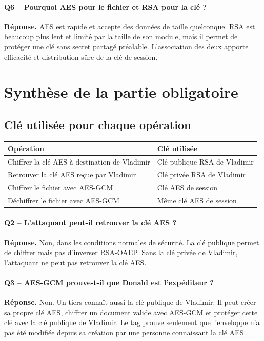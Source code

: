 \documentclass[11pt,a4paper]{article}
\newcommand{\reponse}{\textbf{Réponse.} }
\begin{document}
\paragraph{Q6 -- Pourquoi AES pour le fichier et RSA pour la clé ?}
\reponse AES est rapide et accepte des données de taille quelconque. RSA est beaucoup
plus lent et limité par la taille de son module, mais il permet de protéger une clé sans
secret partagé préalable. L'association des deux apporte efficacité et distribution sûre
de la clé de session.

\section{Synthèse de la partie obligatoire}

\subsection{Clé utilisée pour chaque opération}

\begin{table}[h]
\centering
\begin{tabularx}{\textwidth}{X p{7cm}}
\toprule
\textbf{Opération} & \textbf{Clé utilisée} \\
\midrule
Chiffrer la clé AES à destination de Vladimir & Clé publique RSA de Vladimir \\
Retrouver la clé AES reçue par Vladimir & Clé privée RSA de Vladimir \\
Chiffrer le fichier avec AES-GCM & Clé AES de session \\
Déchiffrer le fichier avec AES-GCM & Même clé AES de session \\
\bottomrule
\end{tabularx}
\end{table}

\paragraph{Q2 -- L'attaquant peut-il retrouver la clé AES ?}
\reponse Non, dans les conditions normales de sécurité. La clé publique permet de
chiffrer mais pas d'inverser RSA-OAEP. Sans la clé privée de Vladimir, l'attaquant ne
peut pas retrouver la clé AES.

\paragraph{Q3 -- AES-GCM prouve-t-il que Donald est l'expéditeur ?}
\reponse Non. Un tiers connaît aussi la clé publique de Vladimir. Il peut créer sa
propre clé AES, chiffrer un document valide avec AES-GCM et protéger cette clé avec la
clé publique de Vladimir. Le tag prouve seulement que l'enveloppe n'a pas été modifiée
depuis sa création par une personne connaissant la clé AES.
\end{document}
